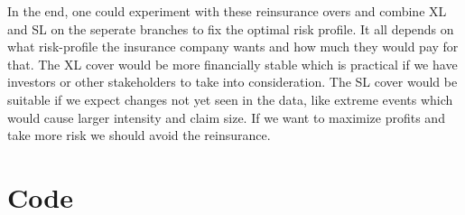 \documentclass[11pt]{article}
\begin{document}
In the end, one could experiment with these reinsurance overs and combine XL and SL on the seperate branches to fix the optimal risk profile.
It all depends on what risk-profile the insurance company wants and how much they would pay for that.
The XL cover would be more financially stable which is practical if we have investors or other stakeholders to take into consideration.
The SL cover would be suitable if we expect changes not yet seen in the data, like extreme events which would cause larger intensity and claim size.
If we want to maximize profits and take more risk we should avoid the reinsurance.

\newpage
\section*{Code}


\end{document}
